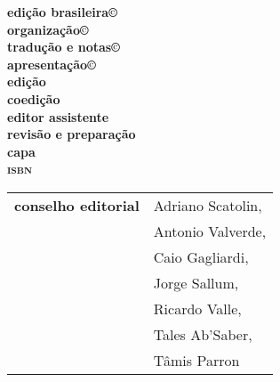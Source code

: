 \newcommand{\linha}[2]{\ifdef{#2}{\linhalayout{#1}{#2}}{}}

\begingroup\tiny
\parindent=0cm
\thispagestyle{empty}

\textbf{edição brasileira©}\\
\textbf{organização©}\\
\textbf{tradução e notas©}\\
\textbf{apresentação©}\\


\textbf{edição}\\
\textbf{coedição}\\
\textbf{editor assistente}\\
\textbf{revisão e preparação}\\
\textbf{capa}\\

\textbf{\textsc{isbn}}

\hspace{-5pt}\begin{tabular}{ll}
\textbf{conselho editorial} & Adriano Scatolin,  \\
							& Antonio Valverde,  \\
							& Caio Gagliardi,    \\
							& Jorge Sallum,      \\
							& Ricardo Valle,     \\
							& Tales Ab'Saber,    \\
							& Tâmis Parron      
\end{tabular}
 
